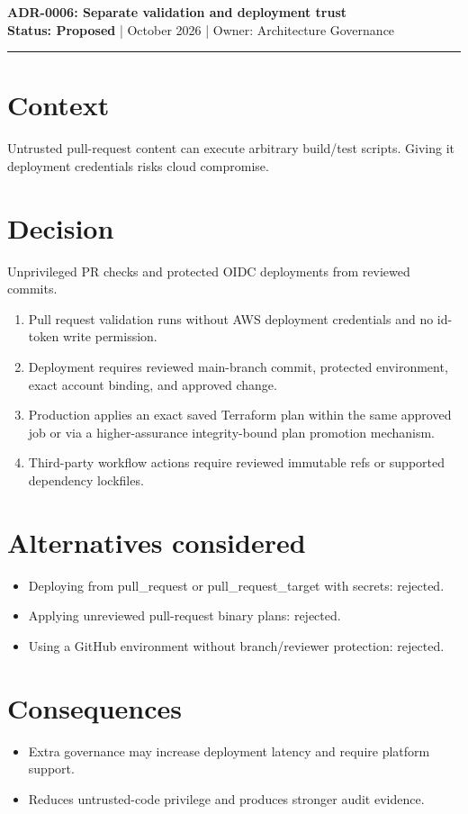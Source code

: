 \documentclass[11pt]{article}
\begin{document}
\begin{center}
{\LARGE\bfseries\color{Navy} ADR-0006: Separate validation and deployment trust }\\[4mm]
\textbf{Status: Proposed} \quad |  October 2026 \quad | \quad Owner: Architecture Governance
\end{center}
\hrule
\section*{Context}
Untrusted pull-request content can execute arbitrary build/test scripts. Giving it deployment credentials risks cloud compromise.
\section*{Decision}
Unprivileged PR checks and protected OIDC deployments from reviewed commits.
\begin{enumerate}[leftmargin=*]
\item Pull request validation runs without AWS deployment credentials and no id-token write permission.
\item Deployment requires reviewed main-branch commit, protected environment, exact account binding, and approved change.
\item Production applies an exact saved Terraform plan within the same approved job or via a higher-assurance integrity-bound plan promotion mechanism.
\item Third-party workflow actions require reviewed immutable refs or supported dependency lockfiles.
\end{enumerate}
\section*{Alternatives considered}
\begin{itemize}[leftmargin=*]
\item Deploying from pull\_request or pull\_request\_target with secrets: rejected.
\item Applying unreviewed pull-request binary plans: rejected.
\item Using a GitHub environment without branch/reviewer protection: rejected.
\end{itemize}
\section*{Consequences}
\begin{itemize}[leftmargin=*]
\item Extra governance may increase deployment latency and require platform support.
\item Reduces untrusted-code privilege and produces stronger audit evidence.
\end{itemize}
\end{document}
